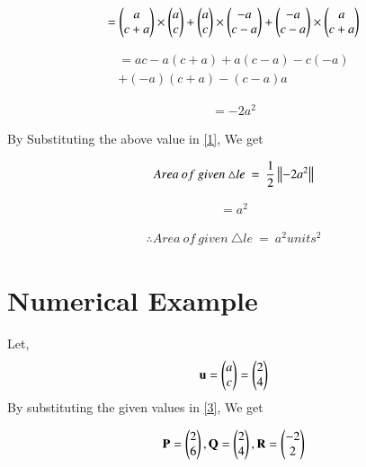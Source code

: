 \documentclass[journal,12pt,twocolumn]{IEEEtran}
\renewcommand\thesection{\arabic{section}}
\begin{document}
\begin{enumerate}[label=\thesection.\arabic*.,ref=\thesection.\theenumi]
\begin{align}
=\begin{pmatrix}a\\c+a\end{pmatrix}\times\begin{pmatrix}a\\c\end{pmatrix}+\begin{pmatrix}a\\c\end{pmatrix}\times\begin{pmatrix}-a\\c-a\end{pmatrix}+\begin{pmatrix}-a\\c-a\end{pmatrix}\times\begin{pmatrix}a\\c+a\end{pmatrix}
\end{align}

\begin{align}
=ac-a(c+a)+a(c-a)-c(-a)\\+(-a)(c+a)-(c-a)a
\end{align}

\begin{align}
=-2a^2
\end{align}

By Substituting the above value in \eqref{1}, We get

\begin{align}
Area\:of\:given\:\triangle le\:=\:\frac{1}{2}\left\lVert-2a^2\right\rVert
\end{align}

\begin{align}
=a^2
\end{align}

\begin{align}
\boxed{\therefore Area\:of\:given\:\triangle le\:=\:a^2 units^2}
\label{4}
\end{align}

\section{Numerical Example}
Let,
\begin{align}
\mathbf{u}=\begin{pmatrix}a\\c\end{pmatrix}=\begin{pmatrix}2\\4\end{pmatrix}
\end{align}
\solution
By substituting the given values in \eqref{3}, We get

\begin{align}
\mathbf{P}=\begin{pmatrix}2\\6\end{pmatrix},\mathbf{Q}=\begin{pmatrix}2\\4\end{pmatrix},\mathbf{R}=\begin{pmatrix}-2\\2\end{pmatrix}
\end{align}


\end{enumerate}
\end{document}
